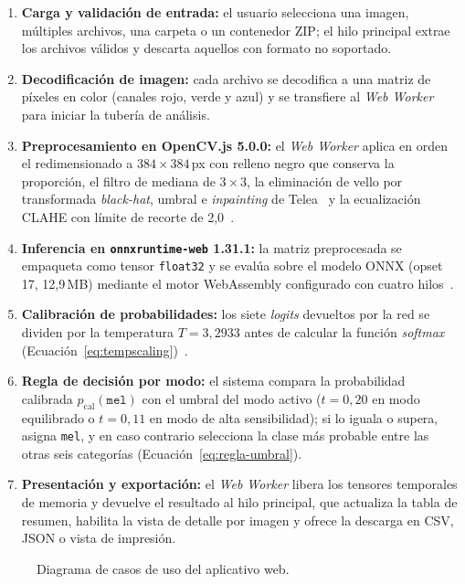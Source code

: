 \begin{enumerate}
  \item \textbf{Carga y validación de entrada:} el usuario selecciona una imagen, múltiples archivos, una carpeta o un contenedor ZIP; el hilo principal extrae los archivos válidos y descarta aquellos con formato no soportado.
  \item \textbf{Decodificación de imagen:} cada archivo se decodifica a una matriz de píxeles en color (canales rojo, verde y azul) y se transfiere al \textit{Web Worker} para iniciar la tubería de análisis.
  \item \textbf{Preprocesamiento en OpenCV.js 5.0.0:} el \textit{Web Worker} aplica en orden el redimensionado a $384 \times 384$\,px con relleno negro que conserva la proporción, el filtro de mediana de $3 \times 3$, la eliminación de vello por transformada \textit{black-hat}, umbral e \textit{inpainting} de Telea~\cite{lee1997dullrazor,telea2004inpainting} y la ecualización CLAHE con límite de recorte de 2,0~\cite{zuiderveld1994clahe}.
  \item \textbf{Inferencia en \texttt{onnxruntime-web} 1.31.1:} la matriz preprocesada se empaqueta como tensor \texttt{float32} y se evalúa sobre el modelo ONNX (opset 17, 12,9\,MB) mediante el motor WebAssembly configurado con cuatro hilos~\cite{ning2024onnxweb}.
  \item \textbf{Calibración de probabilidades:} los siete \textit{logits} devueltos por la red se dividen por la temperatura $T = 3{,}2933$ antes de calcular la función \textit{softmax} (Ecuación~\ref{eq:tempscaling})~\cite{guo2017calibration,penso2024calibration}.
  \item \textbf{Regla de decisión por modo:} el sistema compara la probabilidad calibrada $p_{\text{cal}}(\texttt{mel})$ con el umbral del modo activo ($t = 0{,}20$ en modo equilibrado o $t = 0{,}11$ en modo de alta sensibilidad); si lo iguala o supera, asigna \texttt{mel}, y en caso contrario selecciona la clase más probable entre las otras seis categorías (Ecuación~\ref{eq:regla-umbral}).
  \item \textbf{Presentación y exportación:} el \textit{Web Worker} libera los tensores temporales de memoria y devuelve el resultado al hilo principal, que actualiza la tabla de resumen, habilita la vista de detalle por imagen y ofrece la descarga en CSV, JSON o vista de impresión.
\end{enumerate}

\begin{figure}[H]
  \centering
  \caption{Diagrama de casos de uso del aplicativo web.}
  \label{fig:casos-uso}
\end{figure}

